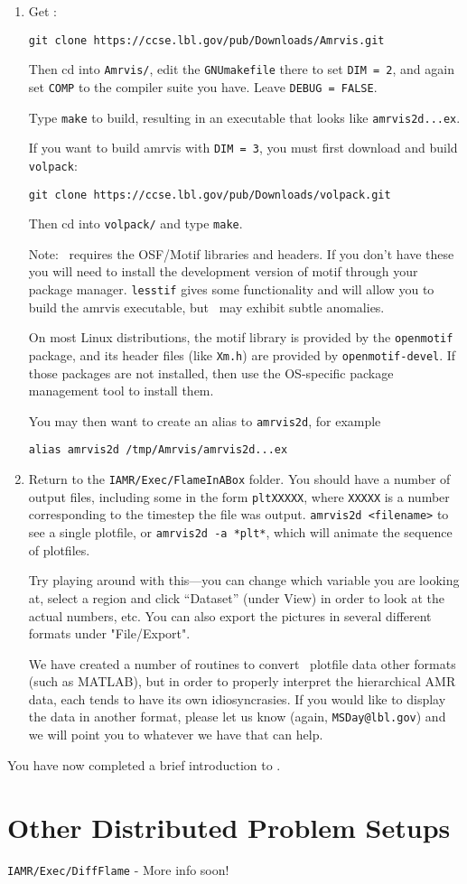 \begin{enumerate}

\item Get \amrvis:
\begin{verbatim}
git clone https://ccse.lbl.gov/pub/Downloads/Amrvis.git
\end{verbatim}

Then cd into {\tt Amrvis/}, edit the {\tt GNUmakefile} there
to set {\tt DIM = 2}, and again set {\tt COMP} to the compiler
suite you have. Leave {\tt DEBUG = FALSE}.

Type {\tt make} to build, resulting in an executable that
looks like {\tt amrvis2d...ex}.

If you want to build amrvis with {\tt DIM = 3}, you must first
download and build {\tt volpack}:
\begin{verbatim}
git clone https://ccse.lbl.gov/pub/Downloads/volpack.git
\end{verbatim}

Then cd into {\tt volpack/} and type {\tt make}.

Note: \amrvis\ requires the OSF/Motif libraries and headers. If you don't have these 
you will need to install the development version of motif through your package manager. 
{\tt lesstif} gives some functionality and will allow you to build the amrvis executable, 
but \amrvis\ may exhibit subtle anomalies.

On most Linux distributions, the motif library is provided by the
{\tt openmotif} package, and its header files (like {\tt Xm.h}) are provided
by {\tt openmotif-devel}. If those packages are not installed, then use the
OS-specific package management tool to install them. 

You may then want to create an alias to {\tt amrvis2d}, for example
\begin{verbatim}
alias amrvis2d /tmp/Amrvis/amrvis2d...ex
\end{verbatim}

\item Return to the {\tt IAMR/Exec/FlameInABox} folder.  You should
  have a number of output files, including some in the form {\tt *pltXXXXX},
  where {\tt XXXXX} is a number corresponding to the timestep the file
  was output.  {\tt amrvis2d <filename>} to see a single plotfile, 
   or {\tt amrvis2d -a *plt*}, which will animate the sequence of plotfiles.

  Try playing
  around with this---you can change which variable you are
  looking at, select a region and click ``Dataset'' (under View)
  in order to look at the actual numbers, etc. You can also export the
  pictures in several different formats under "File/Export".

We have created a number of routines to convert \amrex\ plotfile data
other formats (such as MATLAB), but in order to properly interpret 
the hierarchical AMR data, each tends to have its own idiosyncrasies.
If you would like to display the data in another format, please let us know
(again, {\tt MSDay@lbl.gov}) and we will point you to whatever we have
that can help.

\end{enumerate}

You have now completed a brief introduction to \iamr. 


\section{Other Distributed Problem Setups}
{\tt IAMR/Exec/DiffFlame} - More info soon!
